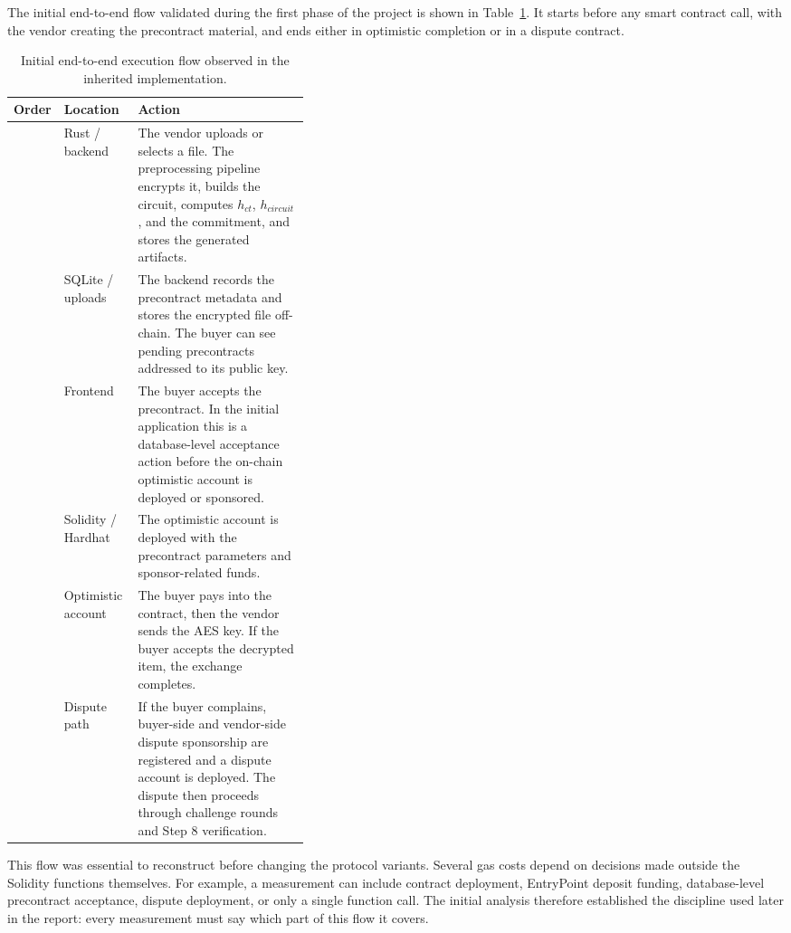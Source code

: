 The initial end-to-end flow validated during the first phase of the project is shown in
Table~\ref{tab:initial-e2e-flow}. It starts before any smart contract call, with the vendor
creating the precontract material, and ends either in optimistic completion or in a dispute
contract.

\begin{table}[htbp]
  \centering
  \begin{tabularx}{\linewidth}{>{\raggedright\arraybackslash}p{0.13\linewidth}>{\raggedright\arraybackslash}p{0.25\linewidth}>{\raggedright\arraybackslash}X}
    \toprule
    Order & Location & Action \\
    \midrule
    1 &
    Rust / backend &
    The vendor uploads or selects a file. The preprocessing pipeline encrypts it, builds the
    circuit, computes \(h_{ct}\), \(h_{circuit}\), and the commitment, and stores the
    generated artifacts. \\
    2 &
    SQLite / uploads &
    The backend records the precontract metadata and stores the encrypted file off-chain. The
    buyer can see pending precontracts addressed to its public key. \\
    3 &
    Frontend &
    The buyer accepts the precontract. In the initial application this is a database-level
    acceptance action before the on-chain optimistic account is deployed or sponsored. \\
    4 &
    Solidity / Hardhat &
    The optimistic account is deployed with the precontract parameters and sponsor-related
    funds. \\
    5 &
    Optimistic account &
    The buyer pays into the contract, then the vendor sends the AES key. If the buyer accepts
    the decrypted item, the exchange completes. \\
    6 &
    Dispute path &
    If the buyer complains, buyer-side and vendor-side dispute sponsorship are registered and
    a dispute account is deployed. The dispute then proceeds through challenge rounds and
    Step 8 verification. \\
    \bottomrule
  \end{tabularx}
  \caption{Initial end-to-end execution flow observed in the inherited implementation.}
  \label{tab:initial-e2e-flow}
\end{table}

This flow was essential to reconstruct before changing the protocol variants. Several gas
costs depend on decisions made outside the Solidity functions themselves. For example, a
measurement can include contract deployment, EntryPoint deposit funding, database-level
precontract acceptance, dispute deployment, or only a single function call. The initial
analysis therefore established the discipline used later in the report: every measurement
must say which part of this flow it covers.

